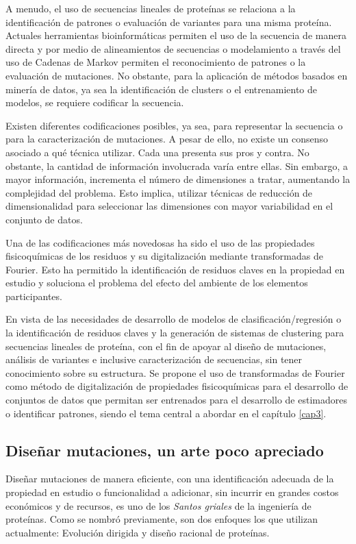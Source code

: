 A menudo, el uso de secuencias lineales de proteínas se relaciona a la identificación de patrones o evaluación de variantes para una misma proteína. Actuales herramientas bioinformáticas permiten el uso de la secuencia de manera directa y por medio de alineamientos de secuencias o modelamiento a través del uso de Cadenas de Markov permiten el reconocimiento de patrones o la evaluación de mutaciones. No obstante, para la aplicación de métodos basados en minería de datos, ya sea la identificación de clusters o el entrenamiento de modelos, se requiere codificar la secuencia.

Existen diferentes codificaciones posibles, ya sea, para representar la secuencia o para la caracterización de mutaciones. A pesar de ello, no existe un consenso asociado a qué técnica utilizar. Cada una presenta sus pros y contra. No obstante, la cantidad de información involucrada varía entre ellas. Sin embargo, a mayor información, incrementa el número de dimensiones a tratar, aumentando la complejidad del problema. Esto implica, utilizar técnicas de reducción de dimensionalidad para seleccionar las dimensiones con mayor variabilidad en el conjunto de datos.

Una de las codificaciones más novedosas ha sido el uso de las propiedades fisicoquímicas de los residuos y su digitalización mediante transformadas de Fourier. Esto ha permitido la identificación de residuos claves en la propiedad en estudio y soluciona el problema del efecto del ambiente de los elementos participantes.

En vista de las necesidades de desarrollo de modelos de clasificación/regresión o la identificación de residuos claves y la generación de sistemas de clustering para secuencias lineales de proteína, con el fin de apoyar al diseño de mutaciones, análisis de variantes e inclusive caracterización de secuencias, sin tener conocimiento sobre su estructura. Se propone el uso de transformadas de Fourier como método de digitalización de propiedades fisicoquímicas para el desarrollo de conjuntos de datos que permitan ser entrenados para el desarrollo de estimadores o identificar patrones, siendo el tema central a abordar en el capítulo \ref{cap3}.

\subsection{Diseñar mutaciones, un arte poco apreciado}

Diseñar mutaciones de manera eficiente, con una identificación adecuada de la propiedad en estudio o funcionalidad a adicionar, sin incurrir en grandes costos económicos y de recursos, es uno de los \textit{Santos griales} de la ingeniería de proteínas. Como se nombró previamente, son dos enfoques los que utilizan actualmente: Evolución dirigida y diseño racional de proteínas.

